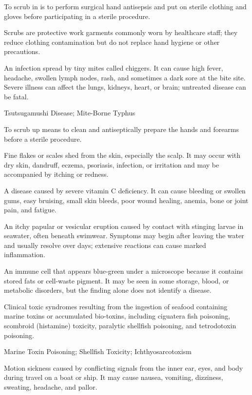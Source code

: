  To scrub in is to perform surgical hand antisepsis and put on sterile clothing and gloves before participating in a sterile procedure.

 Scrubs are protective work garments commonly worn by healthcare staff; they reduce clothing contamination but do not replace hand hygiene or other precautions.

 An infection spread by tiny mites called chiggers. It can cause high fever, headache, swollen lymph nodes, rash, and sometimes a dark sore at the bite site. Severe illness can affect the lungs, kidneys, heart, or brain; untreated disease can be fatal.

\synonyms
Tsutsugamushi Disease; Mite-Borne Typhus

 To scrub up means to clean and antiseptically prepare the hands and forearms before a sterile procedure.

 Fine flakes or scales shed from the skin, especially the scalp. It may occur with dry skin, dandruff, eczema, psoriasis, infection, or irritation and may be accompanied by itching or redness.

 A disease caused by severe vitamin C deficiency. It can cause bleeding or swollen gums, easy bruising,
small skin bleeds, poor wound healing, anemia, bone or joint pain, and fatigue.

 An itchy papular or vesicular eruption caused by contact with stinging larvae in seawater, often beneath swimwear. Symptoms may begin after leaving the water and usually resolve over days; extensive reactions can cause marked inflammation.

 An immune cell that appears blue-green under a microscope because it contains stored fats or cell-waste pigment. It may be seen in some storage, blood, or metabolic disorders, but the finding alone does not identify a disease.

 Clinical toxic syndromes resulting from the ingestion of seafood containing marine toxins or accumulated bio-toxins, including ciguatera fish poisoning, scombroid (histamine) toxicity, paralytic shellfish poisoning, and tetrodotoxin poisoning.

\synonyms
Marine Toxin Poisoning; Shellfish Toxicity; Ichthyosarcotoxism

 Motion sickness caused by conflicting signals from the inner ear, eyes, and body during travel on a boat or ship. It may cause nausea, vomiting, dizziness, sweating, headache, and pallor.

